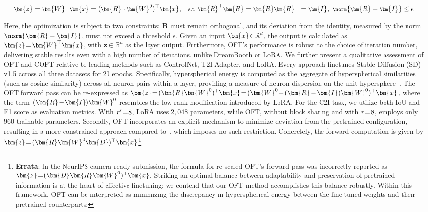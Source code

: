 \begin{equation}\label{eq:coft_general}
    \footnotesize
    \bm{z}=\bm{W}^\top\bm{x}=(\bm{R}\cdot\bm{W}^0)^\top\bm{x},~~~\text{s.t.}~\bm{R}^\top\bm{R}=\bm{R}\bm{R}^\top=\bm{I},~\norm{\bm{R}-\bm{I}}\leq \epsilon
\end{equation}

Here, the optimization is subject to two constraints: $\bm{R}$ must remain orthogonal, and its deviation from the identity, measured by the norm $\norm{\bm{R}-\bm{I}}$, must not exceed a threshold $\epsilon$. Given an input $\thickmuskip=2mu \medmuskip=2mu \bm{x}\in\mathbb{R}^d$, the output is calculated as $\thickmuskip=2mu \medmuskip=2mu \bm{z}=\bm{W}^\top\bm{x}$, with $\bm{z}\in\mathbb{R}^n$ as the layer output. Furthermore, OFT’s performance is robust to the choice of iteration number, delivering stable results even with a high number of iterations, unlike DreamBooth or LoRA. We further present a qualitative assessment of OFT and COFT relative to leading methods such as ControlNet, T2I-Adapter, and LoRA. Every approach finetunes Stable Diffusion (SD) v1.5 across all three datasets for 20 epochs. Specifically, hyperspherical energy is computed as the aggregate of hyperspherical similarities (such as cosine similarity) across all neuron pairs within a layer, providing a measure of neuron dispersion on the unit hypersphere~\cite{liu2021learning}. The OFT forward pass can be re-expressed as $\thickmuskip=2mu \medmuskip=2mu \bm{z}=(\bm{R}\bm{W}^0)^\top\bm{x}=(\bm{W}^0+(\bm{R}-\bm{I})\bm{W}^0)^\top\bm{x}$, where the term $\thickmuskip=2mu \medmuskip=2mu (\bm{R}-\bm{I})\bm{W}^0$ resembles the low-rank modification introduced by LoRA. For the C2I task, we utilize both IoU and F1 score as evaluation metrics. With $\thickmuskip=2mu \medmuskip=2mu r'=8$, LoRA uses $2,048$ parameters, while OFT, without block sharing and with $\thickmuskip=2mu \medmuskip=2mu r=8$, employs only $960$ trainable parameters. Secondly, OFT incorporates an explicit mechanism to minimize deviation from the pretrained configuration, resulting in a more constrained approach compared to~\cite{liu2021orthogonal}, which imposes no such restriction. Concretely, the forward computation is given by $\thickmuskip=2mu \medmuskip=2mu\bm{z}=(\bm{R}\bm{W}^0\bm{D})^\top\bm{x}$\footnote{\textbf{Errata}: In the NeurIPS camera-ready submission, the formula for re-scaled OFT's forward pass was incorrectly reported as $\thickmuskip=2mu \medmuskip=2mu\bm{z}=(\bm{D}\bm{R}\bm{W}^0)^\top\bm{x}$. Striking an optimal balance between adaptability and preservation of pretrained information is at the heart of effective finetuning; we contend that our OFT method accomplishes this balance robustly. Within this framework, OFT can be interpreted as minimizing the discrepancy in hyperspherical energy between the fine-tuned weights and their pretrained counterparts:

}
